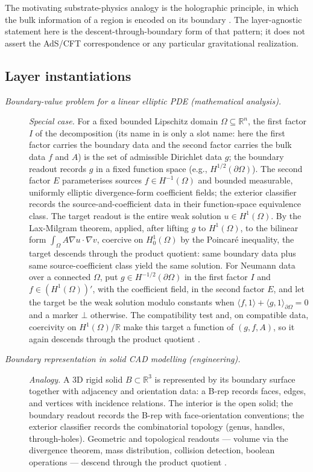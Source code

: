 The motivating substrate-physics analogy is the holographic principle, in which
the bulk information of a region is encoded on its boundary
\citep{Maldacena1997LargeN,Bousso2002Holographic}.  The
layer-agnostic statement here is the descent-through-boundary form
of that pattern; it does not assert the AdS/CFT correspondence or
any particular gravitational realization.

\subsection*{Layer instantiations}\label{layer-inst:F33}

\begingroup\small
\begin{description}
\item[\emph{Boundary-value problem for a linear elliptic
{PDE} (mathematical analysis).}] \textit{Special case.}
For a fixed bounded Lipschitz domain \(\Omega\subseteq\mathbb R^n\), the
first factor \(I\) of the decomposition (its name in  is only a slot name: here the first factor carries the boundary data and the second factor carries the bulk data \(f\) and \(A\)) is the set of admissible Dirichlet data \(g\); the boundary readout records \(g\) in a fixed
function space (e.g., \(H^{1/2}(\partial\Omega)\)).
The second factor \(E\) parameterises sources \(f\in H^{-1}(\Omega)\) and bounded measurable, uniformly elliptic
divergence-form coefficient fields; the exterior classifier records the
source-and-coefficient data in their function-space
equivalence class.  The target readout is the entire
weak solution \(u\in H^1(\Omega)\).  By the Lax-Milgram
theorem, applied, after lifting \(g\) to \(H^1(\Omega)\), to the bilinear form
\(\int_\Omega A\nabla u\cdot\nabla v\), coercive on \(H^1_0(\Omega)\) by the Poincar\'e inequality, the target descends through the product
quotient: same boundary data plus same
source-coefficient class yield the same solution.  For Neumann data over a connected \(\Omega\), put
\(g\in H^{-1/2}(\partial\Omega)\) in the first factor \(I\) and
\(f\in(H^1(\Omega))'\), with the coefficient field, in the second factor \(E\),
and let the target be the weak solution modulo constants when
\(\langle f,1\rangle+\langle g,1\rangle_{\partial\Omega}=0\) and a marker
\(\bot\) otherwise. The compatibility test and, on compatible data,
coercivity on \(H^1(\Omega)/\mathbb R\) make this target a function of
\((g,f,A)\), so it again descends through the product quotient
\citep{Evans2010PartialDifferential}.

\item[\emph{Boundary representation in solid {CAD}
modelling (engineering).}] \textit{Analogy.}
A 3D rigid solid \(B\subset\mathbb R^3\) is represented
by its boundary surface together with adjacency and
orientation data: a B-rep records faces, edges, and
vertices with incidence relations.  The interior is the
open solid; the boundary readout records the B-rep with
face-orientation conventions; the exterior classifier
records the combinatorial topology (genus, handles,
through-holes).  Geometric and topological readouts ---
volume via the divergence theorem, mass distribution,
collision detection, boolean operations --- descend
through the product quotient
\citep{Mortenson2006GeometricModeling}.


\end{description}

